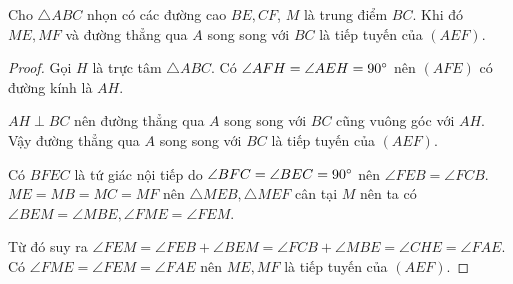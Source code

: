 \begin{lemma}
	Cho $\triangle ABC$ nhọn có các đường cao $BE, CF$, $M$ là trung điểm $BC$. Khi đó $ME, MF$ và đường thẳng qua $A$ song song với $BC$ là tiếp tuyến của $(AEF)$.
\end{lemma}

\begin{center}
	
\end{center}

\begin{proof}
	Gọi $H$ là trực tâm $\triangle ABC$.
	Có $\angle AFH = \angle AEH = 90 \degree$ nên $(AFE)$ có đường kính là $AH$.

	$AH \perp BC$ nên đường thẳng qua $A$ song song với $BC$ cũng vuông góc với $AH$. Vậy đường thẳng qua $A$ song song với $BC$ là tiếp tuyến của $(AEF)$.

	Có $BFEC$ là tứ giác nội tiếp do $\angle BFC = \angle BEC = 90 \degree$ nên $\angle FEB = \angle FCB$. $ME = MB = MC = MF$ nên $\triangle MEB, \triangle MEF$ cân tại $M$ nên ta có $\angle BEM = \angle MBE, \angle FME = \angle FEM$.

	Từ đó suy ra $\angle FEM = \angle FEB + \angle BEM = \angle FCB + \angle MBE = \angle CHE = \angle FAE$. Có $\angle FME = \angle FEM = \angle FAE$ nên $ME, MF$ là tiếp tuyến của $(AEF)$.
\end{proof}